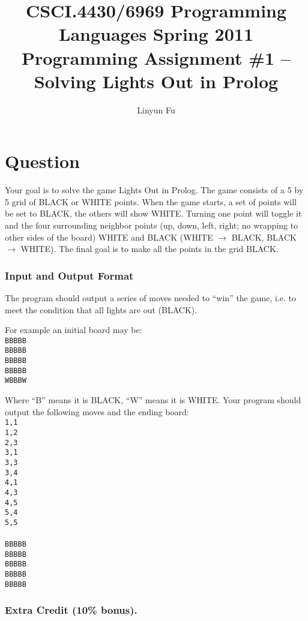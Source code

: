 \documentclass[12pt,letterpaper]{article}
\author{Linyun Fu}
\title{CSCI.4430/6969 Programming Languages Spring 2011\\
Programming Assignment \#1 -- Solving Lights Out in Prolog}
\begin{document}
\maketitle
\part*{Question}
Your goal is to solve the game Lights Out in Prolog. The game consists of a 5 by 5 grid of BLACK or WHITE points. When the game starts, a set of points will be set to BLACK, the others will show WHITE. Turning one point will toggle it and the four surrounding neighbor points (up, down, left, right; no wrapping to other sides of the board) WHITE and BLACK (WHITE $\rightarrow$ BLACK, BLACK $\rightarrow$ WHITE). The final goal is to make all the points in the grid BLACK. 

\section*{Input and Output Format}
The program should output a series of moves needed to ``win'' the game, i.e. to meet the condition that all lights are out (BLACK).

For example an initial board may be:\\
\tt BBBBB\\
BBBBB\\
BBBBB\\
BBBBB\\
WBBBW

\rm Where ``B'' means it is BLACK, ``W'' means it is WHITE. Your program should output the following moves and the ending board:\\
\tt 1,1\\
1,2\\
2,3\\
3,1\\
3,3\\
3,4\\
4,1\\
4,3\\
4,5\\
5,4\\
5,5\\
\\
BBBBB\\
BBBBB\\
BBBBB\\
BBBBB\\
BBBBB
\rm
\section*{Extra Credit (10\% bonus).}
\end{document}
